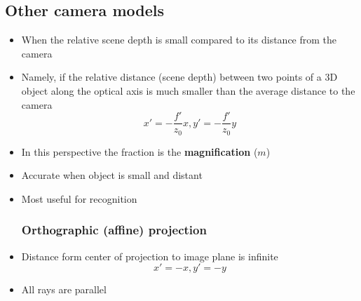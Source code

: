 \subsection{Other camera models}
\begin{itemize}
\subsubsection{Weak perspective projection}
	\item When the relative scene depth is small compared to its distance from the camera
	\item Namely, if the relative distance (scene depth) between two points of a 3D object along the optical axis is much smaller than the average distance to the camera
	$$x'=-\frac{f'}{z_0}x, y'=-\frac{f'}{z_0}y$$
	\item In this perspective the fraction is the \textbf{magnification} ($m$)
	\item Accurate when object is small and distant
	\item Most useful for recognition
\subsubsection{Orthographic (affine) projection}
	\item Distance form center of projection to image plane is infinite
	$$x'=-x, y'=-y$$
	\item All rays are parallel
\end{itemize}